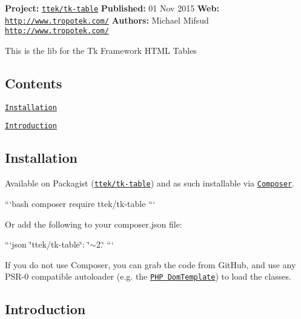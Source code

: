 {\bfseries Project\+:} \href{http://packagist.org/packages/ttek/tk-table}{\tt ttek/tk-\/table} {\bfseries Published\+:} 01 Nov 2015 {\bfseries Web\+:} \href{http://www.tropotek.com/}{\tt http\+://www.\+tropotek.\+com/} {\bfseries Authors\+:} Michael Mifsud \href{http://www.tropotek.com/}{\tt http\+://www.\+tropotek.\+com/}

This is the lib for the Tk Framework H\+T\+M\+L Tables

\subsection*{Contents}


\begin{DoxyItemize}
\item \href{#installation}{\tt Installation}
\item \href{#introduction}{\tt Introduction}
\end{DoxyItemize}

\subsection*{Installation}

Available on Packagist (\href{http://packagist.org/packages/ttek/tk-table}{\tt ttek/tk-\/table}) and as such installable via \href{http://getcomposer.org/}{\tt Composer}.

```bash composer require ttek/tk-\/table ```

Or add the following to your composer.\+json file\+:

```json \char`\"{}ttek/tk-\/table\char`\"{}\+: \char`\"{}$\sim$2.\char`\"{} ```

If you do not use Composer, you can grab the code from Git\+Hub, and use any P\+S\+R-\/0 compatible autoloader (e.\+g. the \href{https://github.com/tropotek/tk-table}{\tt P\+H\+P Dom\+Template}) to load the classes.

\subsection*{Introduction}